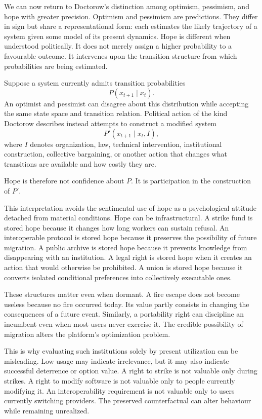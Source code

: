 \documentclass[11pt]{article}
\begin{document}
We can now return to Doctorow's distinction among optimism, pessimism, and hope with greater precision. Optimism and pessimism are predictions. They differ in sign but share a representational form: each estimates the likely trajectory of a system given some model of its present dynamics. Hope is different when understood politically. It does not merely assign a higher probability to a favourable outcome. It intervenes upon the transition structure from which probabilities are being estimated.

Suppose a system currently admits transition probabilities
\[
P(x_{t+1}\mid x_t).
\]
An optimist and pessimist can disagree about this distribution while accepting the same state space and transition relation. Political action of the kind Doctorow describes instead attempts to construct a modified system
\[
P'(x_{t+1}\mid x_t,I),
\]
where \(I\) denotes organization, law, technical intervention, institutional construction, collective bargaining, or another action that changes what transitions are available and how costly they are.

Hope is therefore not confidence about \(P\). It is participation in the construction of \(P'\).

This interpretation avoids the sentimental use of hope as a psychological attitude detached from material conditions. Hope can be infrastructural. A strike fund is stored hope because it changes how long workers can sustain refusal. An interoperable protocol is stored hope because it preserves the possibility of future migration. A public archive is stored hope because it prevents knowledge from disappearing with an institution. A legal right is stored hope when it creates an action that would otherwise be prohibited. A union is stored hope because it converts isolated conditional preferences into collectively executable ones.

These structures matter even when dormant. A fire escape does not become useless because no fire occurred today. Its value partly consists in changing the consequences of a future event. Similarly, a portability right can discipline an incumbent even when most users never exercise it. The credible possibility of migration alters the platform's optimization problem.

This is why evaluating such institutions solely by present utilization can be misleading. Low usage may indicate irrelevance, but it may also indicate successful deterrence or option value. A right to strike is not valuable only during strikes. A right to modify software is not valuable only to people currently modifying it. An interoperability requirement is not valuable only to users currently switching providers. The preserved counterfactual can alter behaviour while remaining unrealized.
\end{document}
